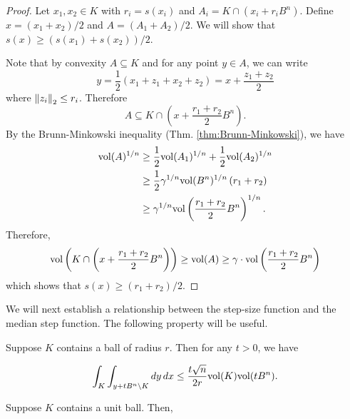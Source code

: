 \begin{proof}
Let $x_{1},x_{2}\in K$ with $r_{i}=s(x_{i})$ and $A_{i}=K\cap(x_{i}+r_{i}B^{n})$.
Define $x=(x_{1}+x_{2})/2$ and $A=(A_{1}+A_{2})/2$. We will show
that $s(x)\ge(s(x_{1})+s(x_{2}))/2$. 

Note that by convexity $A\subseteq K$ and for any point $y\in A$,
we can write 
\[
y=\frac{1}{2}(x_{1}+z_{1}+x_{2}+z_{2})=x+\frac{z_{1}+z_{2}}{2}
\]
where $\left\Vert z_{i}\right\Vert_{2}\le r_{i}$. Therefore 
\[
A\subseteq K\cap\left(x+\frac{r_{1}+r_{2}}{2}B^{n}\right).
\]
By the Brunn-Minkowski inequality (Thm. \ref{thm:Brunn-Minkowski}),
we have 
\begin{align*}
\mathrm{vol}(A)^{1/n} & \ge\frac{1}{2}\mathrm{vol}(A_{1})^{1/n}+\frac{1}{2}\mathrm{vol}(A_{2})^{1/n}\\
 & \ge\frac{1}{2}\gamma^{1/n}\mathrm{vol}(B^{n})^{1/n}\left(r_{1}+r_{2}\right)\\
 & \ge\gamma^{1/n}\mathrm{vol}\left(\frac{r_{1}+r_{2}}{2}B^{n}\right)^{1/n}.
\end{align*}
Therefore, 
\[
\mathrm{vol}\left(K\cap\left(x+\frac{r_{1}+r_{2}}{2}B^{n}\right)\right)\ge\mathrm{vol}(A)\ge\gamma\cdot\mathrm{vol}\left(\frac{r_{1}+r_{2}}{2}B^{n}\right)
\]
which shows that $s(x)\ge(r_{1}+r_{2})/2$. 
\end{proof}
We will next establish a relationship between the step-size function
and the median step function. The following property \cite[Corollary 4.6]{kannan1997random}
will be useful.
\begin{lem}
\label{lem:step_out_prob}Suppose $K$ contains a ball of radius $r$.
Then for any $t>0$, we have
\end{lem}

\[
\int_{K}\int_{y+tB^{n}\setminus K}dy\,dx\le\frac{t\sqrt{n}}{2r}\mathrm{vol}(K)\mathrm{vol}(tB^{n}).
\]

\begin{lem}
\label{lem:step-size} Suppose $K$ contains a unit ball. Then, 
\end{lem}

